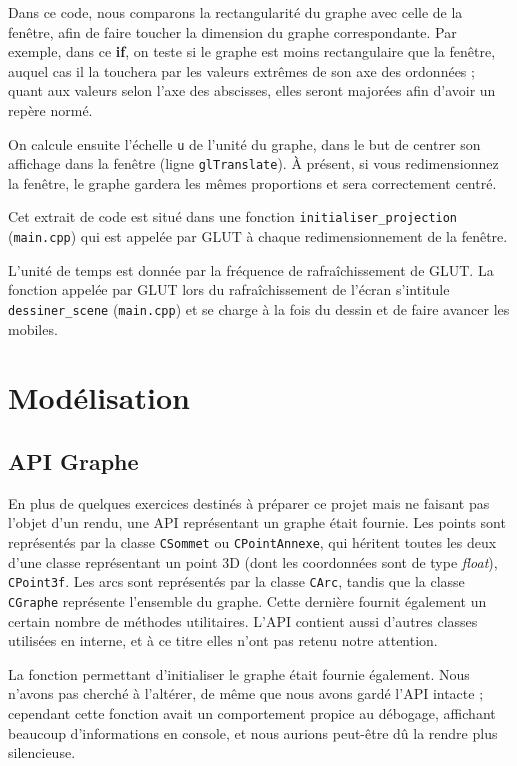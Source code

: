 \documentclass[a4paper, oneside, 11pt, twocolumn]{article}
\begin{document}
Dans ce code, nous comparons la rectangularité du graphe avec celle de la fenêtre, afin de faire toucher la dimension du graphe correspondante. Par exemple, dans ce \textbf{if}, on teste si le graphe est moins rectangulaire que la fenêtre, auquel cas il la touchera par les valeurs extrêmes de son axe des ordonnées ; quant aux valeurs selon l'axe des abscisses, elles seront majorées afin d'avoir un repère normé.

On calcule ensuite l'échelle \texttt{u} de l'unité du graphe, dans le but de centrer son affichage dans la fenêtre (ligne \texttt{glTranslate}). À présent, si vous redimensionnez la fenêtre, le graphe gardera les mêmes proportions et sera correctement centré.

Cet extrait de code est situé dans une fonction \texttt{initialiser\_projection} (\texttt{main.cpp}) qui est appelée par GLUT à chaque redimensionnement de la fenêtre.

L'unité de temps est donnée par la fréquence de rafraîchissement de GLUT. La fonction appelée par GLUT lors du rafraîchissement de l'écran s'intitule \texttt{dessiner\_scene} (\texttt{main.cpp}) et se charge à la fois du dessin et de faire avancer les mobiles.


\section{Modélisation}

\subsection{API Graphe}

En plus de quelques exercices destinés à préparer ce projet mais ne faisant pas l'objet d'un rendu, une API représentant un graphe était fournie. Les points sont représentés par la classe \texttt{CSommet} ou \texttt{CPointAnnexe}, qui héritent toutes les deux d'une classe représentant un point 3D (dont les coordonnées sont de type \emph{float}), \texttt{CPoint3f}. Les arcs sont représentés par la classe \texttt{CArc}, tandis que la classe \texttt{CGraphe} représente l'ensemble du graphe. Cette dernière fournit également un certain nombre de méthodes utilitaires. L'API contient aussi d'autres classes utilisées en interne, et à ce titre elles n'ont pas retenu notre attention.

La fonction permettant d'initialiser le graphe était fournie également. Nous n'avons pas cherché à l'altérer, de même que nous avons gardé l'API intacte ; cependant cette fonction avait un comportement propice au débogage, affichant beaucoup d'informations en console, et nous aurions peut-être dû la rendre plus silencieuse.
\end{document}
